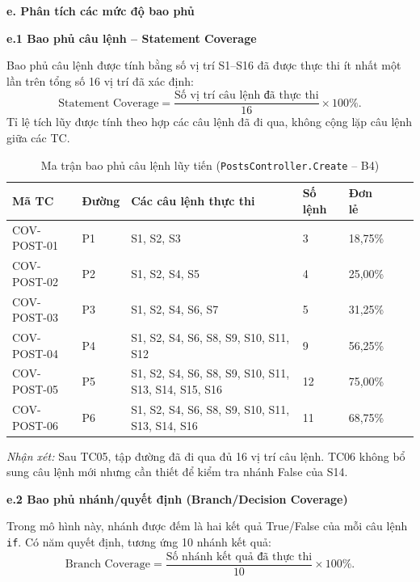 \documentclass[11pt,a4paper]{article}
\begin{document}
\noindent\textbf{e. Phân tích các mức độ bao phủ}

\noindent\textbf{e.1 Bao phủ câu lệnh -- Statement Coverage}

\noindent Bao phủ câu lệnh được tính bằng số vị trí S1--S16 đã được thực thi ít nhất một lần trên tổng số 16 vị trí đã xác định:
\[
\text{Statement Coverage} = \frac{\text{Số vị trí câu lệnh đã thực thi}}{16} \times 100\%.
\]
Tỉ lệ tích lũy được tính theo hợp các câu lệnh đã đi qua, không cộng lặp câu lệnh giữa các TC.

\begin{table}[H]
\centering
\scriptsize
\begin{tabularx}{\textwidth}{|L{2.2cm}|C{1.1cm}|X|C{1.2cm}|C{1.4cm}|C{1.4cm}|C{1.6cm}|}
\hline
{}
\textbf{Mã TC} & \textbf{Đường} & \textbf{Các câu lệnh thực thi} & \textbf{Số lệnh} & \textbf{Đơn lẻ}  \tabularnewline
\hline
COV-POST-01 & P1 & S1, S2, S3 & 3 & 18,75\%  \\ \hline
COV-POST-02 & P2 & S1, S2, S4, S5 & 4 & 25,00\%  \\ \hline
COV-POST-03 & P3 & S1, S2, S4, S6, S7 & 5 & 31,25\% \\ \hline
COV-POST-04 & P4 & S1, S2, S4, S6, S8, S9, S10, S11, S12 & 9 & 56,25\%  \\ \hline
COV-POST-05 & P5 & S1, S2, S4, S6, S8, S9, S10, S11, S13, S14, S15, S16 & 12 & 75,00\%  \\ \hline
COV-POST-06 & P6 & S1, S2, S4, S6, S8, S9, S10, S11, S13, S14, S16 & 11 & 68,75\%  \\ \hline
\end{tabularx}
\caption{Ma trận bao phủ câu lệnh lũy tiến (\texttt{PostsController.Create} -- B4)}
\end{table}

\noindent\textit{Nhận xét:} Sau TC05, tập đường đã đi qua đủ 16 vị trí câu lệnh. TC06 không bổ sung câu lệnh mới nhưng cần thiết để kiểm tra nhánh False của S14.

\noindent\textbf{e.2 Bao phủ nhánh/quyết định (Branch/Decision Coverage)}

\noindent Trong mô hình này, nhánh được đếm là hai kết quả True/False của mỗi câu lệnh \texttt{if}. Có năm quyết định, tương ứng 10 nhánh kết quả:
\[
\text{Branch Coverage} = \frac{\text{Số nhánh kết quả đã thực thi}}{10} \times 100\%.
\]
\end{document}
